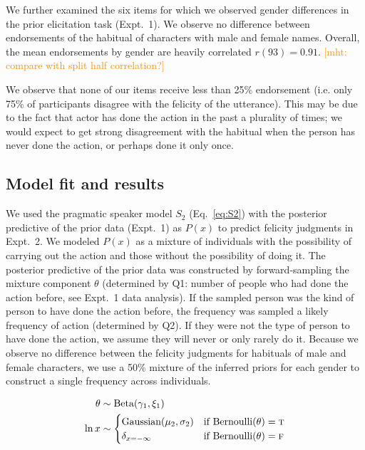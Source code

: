 \documentclass[10pt,letterpaper]{article}
\newcommand{\mht}[1]{\textcolor{DarkOrange}{[mht: #1]}}
\begin{document}
We further examined the six items for which we observed gender differences in the prior elicitation task (Expt.~1).
We observe no difference between endorsements of the habitual of characters with male and female names. 
Overall, the mean endorsements by gender are heavily correlated $r(93) = 0.91$. \mht{compare with split half correlation?}

We observe that none of our items receive less than 25\% endorsement (i.e. only 75\% of participants disagree with the felicity of the utterance).
This may be due to the fact that actor has done the action in the past a plurality of times; we would expect to get strong disagreement with the habitual when the person has never done the action, or perhaps done it only once.

\subsection{Model fit and results}

We used the pragmatic speaker model $S_2$ (Eq.~\ref{eq:S2}) with the posterior predictive of the prior data (Expt.~1) as $P(x)$  to predict felicity judgments in Expt.~2.
We modeled $P(x)$ as a mixture of individuals with the possibility of carrying out the action and those without the possibility of doing it. 
The posterior predictive of the prior data was constructed by forward-sampling the mixture component $\theta$ (determined by Q1: number of people who had done the action before, see Expt.~1 data analysis).
If the sampled person was the kind of person to have done the action before, the frequency was sampled a likely frequency of action (determined by Q2). 
If they were not the type of person to have done the action, we assume they will never or only rarely do it.
Because we observe no difference between the felicity judgments for habituals of male and female characters, we use a 50\% mixture of the inferred priors for each gender to construct a single frequency across individuals.
\begin{minipage}{0.5 \textwidth} \small
\begin{align*}
\theta & \sim \text{Beta}(\gamma_{1}, \xi_{1}) \\ 
\ln x & \sim \begin{cases} 
		\text{Gaussian}(\mu_{2}, \sigma_{2}) &\mbox{if } \text{Bernoulli}(\theta) = \textsc{t} \\
				\delta_{x=-\infty} &\mbox{if } \text{Bernoulli}(\theta) = \textsc{f} \\
		\end{cases} \\
\end{align*}
\end{minipage}
\end{document}
